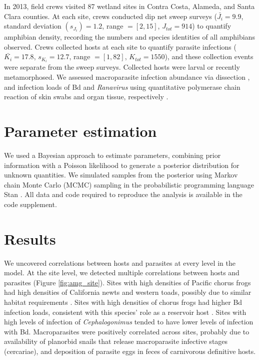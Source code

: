 In 2013, field crews visited 87 wetland sites in Contra Costa, Alameda, and Santa Clara counties.
At each site, crews conducted dip net sweep surveys ($\bar{J_i} = 9.9$, standard deviation $(s_{J_i}) = 1.2$, range $= [2, 15]$, $J_{tot} = 914$) to quantify amphibian density, recording the numbers and species identities of all amphibians observed.
Crews collected hosts at each site to quantify parasite infections ($\bar{K_i} = 17.8$, $s_{K_i}=12.7$, range $=[1, 82]$, $K_{tot} = 1550$), and these collection events were separate from the sweep surveys.
Collected hosts were larval or recently metamorphosed.
We assessed macroparasite infection abundance via dissection \citep{Johnson2013}, and infection loads of Bd and \textit{Ranavirus} using quantitative polymerase chain reaction of skin swabs and organ tissue, respectively \citep{Hyatt2007, Hoverman2010}.

\section{Parameter estimation}

We used a Bayesian approach to estimate parameters, combining prior information with a Poisson likelihood to generate a posterior distribution for unknown quantities.
We simulated samples from the posterior using Markov chain Monte Carlo (MCMC) sampling in the probabilistic programming language Stan \citep{Hoffman2014} \nocite{stan-software:2015, rstan-software:2015}.
All data and code required to reproduce the analysis is available in the code supplement.

\section{Results}

We uncovered correlations between hosts and parasites at every level in the model.
At the site level, we detected multiple correlations between hosts and parasites (Figure \ref{fig:amg_site}).
Sites with high densities of Pacific chorus frogs had high densities of California newts and western toads, possibly due to similar habitat requirements \citep{Joseph2015}.
Sites with high densities of chorus frogs had higher Bd infection loads, consistent with this species' role as a reservoir host \citep{Reeder2012}.
Sites with high levels of infection of \textit{Cephalogonimus} tended to have lower levels of infection with Bd.
Macroparasites were positively correlated across sites, probably due to availability of planorbid snails that release macroparasite infective stages (cercariae), and deposition of parasite eggs in feces of carnivorous definitive hosts.

